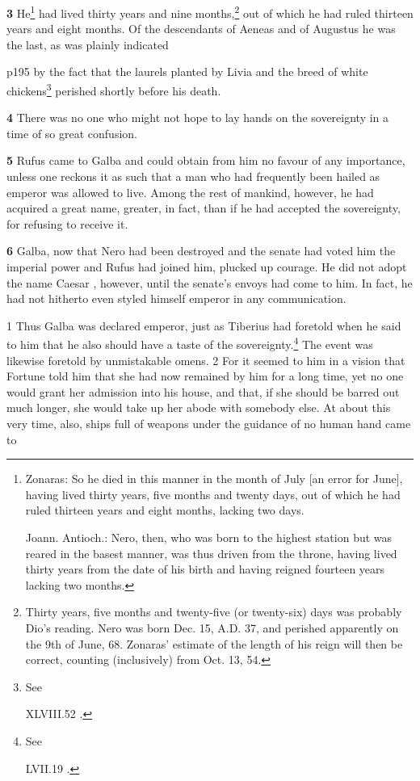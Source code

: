 \textbf{3} He\texthebrew{⁠}\footnote{Zonaras: So he died in this manner in the month of July [an error for June], having lived thirty years, five months and twenty days, out of which he had ruled thirteen years and eight months, lacking two days.

Joann. Antioch.: Nero, then, who was born to the highest station but was reared in the basest manner, was thus driven from the throne, having lived thirty years from the date of his birth and having reigned fourteen years lacking two months.

} had lived thirty years and nine months,\texthebrew{⁠}\footnote{Thirty years, five months and twenty-five (or twenty-six) days was probably Dio's reading. Nero was born Dec. 15, A.D. 37, and perished apparently on the 9th of June, 68. Zonaras' estimate of the length of his reign will then be correct, counting (inclusively) from Oct. 13, 54.

} out of which he had ruled thirteen years and eight months. Of the descendants of Aeneas and of Augustus he was the last, as was plainly indicated

p195 by the fact that the laurels planted by Livia and the breed of white chickens\texthebrew{⁠}\footnote{See

XLVIII.52 .

} perished shortly before his death.

\textbf{4} There was no one who might not hope to lay hands on the sovereignty in a time of so great confusion.

\textbf{5} Rufus came to Galba and could obtain from him no favour of any importance, unless one reckons it as such that a man who had frequently been hailed as emperor was allowed to live. Among the rest of mankind, however, he had acquired a great name, greater, in fact, than if he had accepted the sovereignty, for refusing to receive it.

\textbf{6} Galba, now that Nero had been destroyed and the senate had voted him the imperial power and Rufus had joined him, plucked up courage. He did not adopt the name Caesar , however, until the senate's envoys had come to him. In fact, he had not hitherto even styled himself emperor in any communication.


1
Thus Galba was declared emperor, just as Tiberius had foretold when he said to him that he also should have a taste of the sovereignty.\texthebrew{⁠}\footnote{See

LVII.19 .

} The event was likewise foretold by unmistakable omens. 2 For it seemed to him in a vision that Fortune told him that she had now remained by him for a long time, yet no one would grant her admission into his house, and that, if she should be barred out much longer, she would take up her abode with somebody else. At about this very time, also, ships full of weapons under the guidance of no human hand came to

